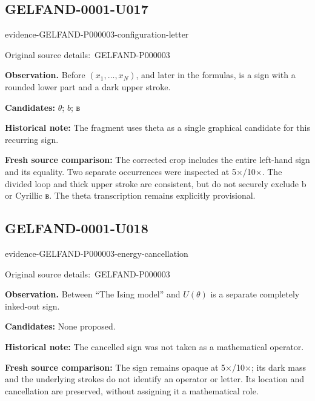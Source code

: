 \documentclass[11pt]{article}
\newcommand{\EvidenceBlock}[4]{%
 \par\smallskip\noindent\begin{minipage}{\linewidth}
 \begin{minipage}[t]{.47\linewidth}\vspace{0pt}\centering
 \csname evidence-#1-#2\endcsname\par
 {\scriptsize\SourceCropCaption\ #1}\par
 \end{minipage}\hfill
 \begin{minipage}[t]{.49\linewidth}\vspace{0pt}\raggedright
 {\small\color{orange!65!black}\textbf{#4} #3}\par
 \end{minipage}
 \end{minipage}\par\smallskip}
\newcommand{\SourceCropCaption}{Original source details:}\newcommand{\ReadingCaption}{Uncertain reading.}\newcommand{\IncompleteCaption}{Undeciphered passage.}\newcommand{\DiagramCaption}{Diagram and typed description.}
\begin{document}
\subsection*{GELFAND-0001-U017}
\EvidenceBlock{GELFAND-P000003}{configuration-letter}{Before \((x_1,\ldots,x_N)\), and later in the formulas, is a sign with a rounded lower part and a dark upper stroke.}{Observation.}
\par\smallskip\noindent\textbf{Candidates: } \(\theta\); \(b\); в\par
\par\smallskip\noindent\textbf{Historical note: } The fragment uses theta as a single graphical candidate for this recurring sign.\par
\par\smallskip\noindent\textbf{Fresh source comparison: } The corrected crop includes the entire left-hand sign and its equality. Two separate occurrences were inspected at 5×/10×. The divided loop and thick upper stroke are consistent, but do not securely exclude b or Cyrillic в. The theta transcription remains explicitly provisional.\par

\subsection*{GELFAND-0001-U018}
\EvidenceBlock{GELFAND-P000003}{energy-cancellation}{Between “The Ising model” and \(U(\theta)\) is a separate completely inked-out sign.}{Observation.}
\par\smallskip\noindent\textbf{Candidates: } None proposed.\par
\par\smallskip\noindent\textbf{Historical note: } The cancelled sign was not taken as a mathematical operator.\par
\par\smallskip\noindent\textbf{Fresh source comparison: } The sign remains opaque at 5×/10×; its dark mass and the underlying strokes do not identify an operator or letter. Its location and cancellation are preserved, without assigning it a mathematical role.\par
\end{document}
